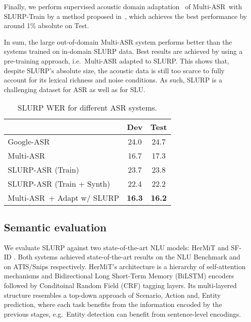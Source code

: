 \documentclass[11pt,a4paper]{article}
\newcommand{\datasetacr}{SLURP}
\newcommand{\slu}{SLU}
\newcommand{\asr}{ASR}
\newcommand{\nlu}{NLU}
\newcommand{\wer}{WER}
\newcommand{\hermit}{HerMiT}
\newcommand{\sfid}{SF-ID}
\newcommand{\gasr}{Google-ASR}
\newcommand{\masr}{Multi-ASR}
\begin{document}
Finally, we perform supervised acoustic domain adaptation~\cite{bell2020adaptation} of \masr~with \datasetacr-Train by a method proposed in~\cite{swietojanski2016learning}, which achieves the best performance by around 1\% absolute on Test.

In sum, the large out-of-domain \masr{} system performs better than the systems trained on in-domain \datasetacr{} data. Best results are achieved by using a pre-training approach, i.e.\ \masr{} adapted to \datasetacr. This shows that, despite \datasetacr's absolute size, 
the acoustic data is still too scarce to fully account for its lexical richness and noise conditions. As such, \datasetacr{} is a challenging dataset for \asr{} as well as for \slu.




\begin{table}[t]
	\centering
	\small
	\begin{tabular}{l|c|c}
	\toprule
&  Dev & Test \\ 
	\midrule
    \gasr  & 24.0 & 24.7 \\
    \masr  & 16.7 & 17.3 \\
    \midrule
    \datasetacr{}-ASR (Train) & 23.7  & 23.8 \\
    \datasetacr{}-ASR (Train + Synth) & 22.4 & 22.2 \\ 
    \midrule
    \masr~+ Adapt w/ \datasetacr  &  {\bf 16.3} & {\bf 16.2} \\
    \bottomrule
	\end{tabular}
	\caption{\datasetacr{} \wer{} for different \asr{} systems.}
	\label{tab:wers_generic}
\end{table}

\subsection{Semantic evaluation}


 We evaluate \datasetacr{} against two state-of-the-art \nlu{} models:
\hermit{} \cite{vanzo:2019b} and \sfid{} \cite{e-etal-2019-novel}. Both systems achieved state-of-the-art results on the NLU Benchmark \cite{liu19:benchmarking} and on ATIS/Snips respectively.
\hermit's architecture is a hierarchy of self-attention mechanisms and Bidirectional Long Short-Term Memory (BiLSTM) encoders followed by Conditoinal Random Field (CRF) tagging layers. Its multi-layered structure resembles a  top-down approach of Scenario, Action and, Entity prediction, where each task benefits from the information encoded by the previous stages, e.g.\ Entity detection can benefit from sentence-level encodings. 
\end{document}
